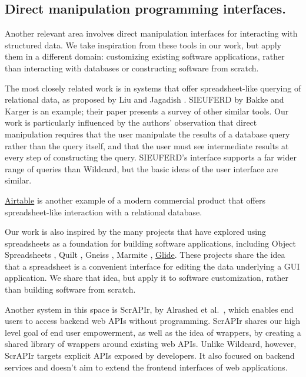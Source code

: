 \documentclass[sigplan,screen,10pt,anonymous,review]{acmart}
\begin{document}
\hypertarget{direct-manipulation-programming-interfaces.}{%
\subsection{Direct manipulation programming
interfaces.}\label{direct-manipulation-programming-interfaces.}}

Another relevant area involves direct manipulation interfaces for
interacting with structured data. We take inspiration from these tools
in our work, but apply them in a different domain: customizing existing
software applications, rather than interacting with databases or
constructing software from scratch.

The most closely related work is in systems that offer spreadsheet-like
querying of relational data, as proposed by Liu and Jagadish
\citep{liu2009}. SIEUFERD by Bakke and Karger \citep{bakke2016} is an
example; their paper presents a survey of other similar tools. Our work
is particularly influenced by the authors' observation that direct
manipulation requires that the user manipulate the results of a database
query rather than the query itself, and that the user must see
intermediate results at every step of constructing the query. SIEUFERD's
interface supports a far wider range of queries than Wildcard, but the
basic ideas of the user interface are similar.

\href{https://airtable.com/}{Airtable} is another example of a modern
commercial product that offers spreadsheet-like interaction with a
relational database.

Our work is also inspired by the many projects that have explored using
spreadsheets as a foundation for building software applications,
including Object Spreadsheets \citep{mccutchen2016}, Quilt
\citep{benson2014}, Gneiss \citep{chang2014}, Marmite \citep{wong2007},
\href{https://www.glideapps.com/}{Glide}. These projects share the idea
that a spreadsheet is a convenient interface for editing the data
underlying a GUI application. We share that idea, but apply it to
software customization, rather than building software from scratch.

Another system in this space is ScrAPIr, by Alrashed et
al.~\citep{alrashed2020}, which enables end users to access backend web
APIs without programming. ScrAPIr shares our high level goal of end user
empowerment, as well as the idea of wrappers, by creating a shared
library of wrappers around existing web APIs. Unlike Wildcard, however,
ScrAPIr targets explicit APIs exposed by developers. It also focused on
backend services and doesn't aim to extend the frontend interfaces of
web applications.
\end{document}
